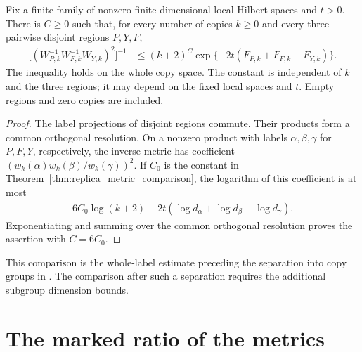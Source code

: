 \begin{theorem}
    \label{thm:replica_metric_whole_inverse}
    \leanok
    Fix a finite family of nonzero finite-dimensional local Hilbert spaces
    and $t>0$. There is $C\ge0$ such that, for every number of copies $k\ge0$
    and every three pairwise disjoint regions $P,Y,F$,
    \begin{align}
        \bigl[(W_{P,k}^{-1}W_{F,k}^{-1}W_{Y,k})^2\bigr]^{-1}
        &\le (k+2)^C\exp\{-2t(F_{P,k}+F_{F,k}-F_{Y,k})\}.
    \end{align}
    The inequality holds on the whole copy space. The constant is independent
    of $k$ and the three regions; it may depend on the fixed local spaces and $t$.
    Empty regions and zero copies are included.
\end{theorem}
\begin{proof}\leanok
    The label projections of disjoint regions commute. Their products form
    a common orthogonal resolution. On a nonzero product with labels
    $\alpha,\beta,\gamma$ for $P,F,Y$, respectively, the inverse metric has
    coefficient $(w_k(\alpha)w_k(\beta)/w_k(\gamma))^2$.
    If $C_0$ is the constant in Theorem~\ref{thm:replica_metric_comparison},
    the logarithm of this coefficient is at most
    \begin{align}
        6C_0\log(k+2)-2t(\log d_\alpha+\log d_\beta-\log d_\gamma).
    \end{align}
    Exponentiating and summing over the common orthogonal resolution proves
    the assertion with $C=6C_0$.
\end{proof}

This comparison is the whole-label estimate preceding the separation into
copy groups in \cite{OpenAI2026AreaLaw}. The comparison after such a separation
requires the additional subgroup dimension bounds.

\section{The marked ratio of the metrics}

